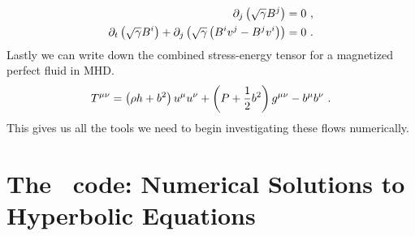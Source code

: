     \begin{align}
    	\partial_j \left( \sqrt{\gam} B^j \right) &= 0 \ , \eqlabel{divB}\\
	\partial_t \left( \sqrt{\gam} B^i \right) + \partial_j \left(\sqrt{\gam}\left(B^i v^j - B^j v^i\right)\right) &= 0\ . \eqlabel{induction}
    \end{align}
    Lastly we can write down the combined stress-energy tensor for a magnetized perfect fluid in MHD.
    \begin{equation}
    	T^{\mu\nu} = \left(\rho h + b^2\right) u^\mu u^\nu + \left(P + \frac{1}{2}b^2\right)g^{\mu\nu} - b^\mu b^\nu \ . \eqlabel{TmunuGRMHD}
    \end{equation}
    This gives us all the tools we need to begin investigating these flows numerically.

\section{The \grdisco\ code: Numerical Solutions to Hyperbolic Equations}

